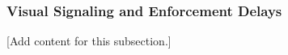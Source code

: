 
\subsubsection{Visual Signaling and Enforcement Delays}
\label{subsubsec:design_7_1_visual_signaling_enforcement_delays}

[Add content for this subsection.]
